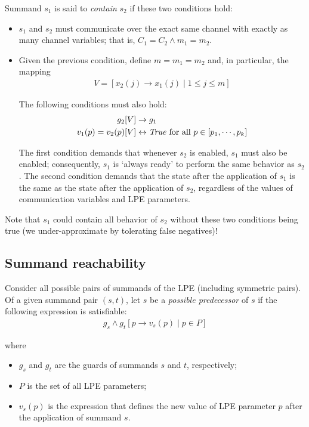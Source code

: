 Summand $s_1$ is said to \emph{contain} $s_2$ if these two conditions hold:

\begin{itemize}
\item $s_1$ and $s_2$ must communicate over the exact same channel with exactly as many channel variables; that is, $C_1 = C_2 \land m_1 = m_2$.

\item Given the previous condition, define $m = m_1 = m_2$ and, in particular, the mapping
\begin{align*}
V = [x_2(j) \rightarrow x_1(j) \;|\; 1 \leq j \leq m]
\end{align*}

The following conditions must also hold:
\begin{align*}
g_2[V] &\rightarrow g_1 \\
v_1(p) = v_2(p)[V] &\leftrightarrow \text{\textit{True}} \text{ for all } p \in [p_1, \cdots{}, p_k]
\end{align*}

The first condition demands that whenever $s_2$ is enabled, $s_1$ must also be enabled; consequently, $s_1$ is `always ready' to perform the same behavior as $s_2$.
The second condition demands that the state after the application of $s_1$ is the same as the state after the application of $s_2$, regardless of the values of communication variables and LPE parameters.
\end{itemize}

Note that $s_1$ could contain all behavior of $s_2$ without these two conditions being true (we under-approximate by tolerating false negatives)!

\subsection{Summand reachability}

Consider all possible pairs of summands of the LPE (including symmetric pairs).
Of a given summand pair $(s, t)$, let $s$ be a \emph{possible predecessor} of $s$ if the following expression is satisfiable:
\begin{align*}
g_s \land {g_t}[p \rightarrow v_s(p) \;|\; p \in P]
\end{align*}

where

\begin{itemize}
\item $g_s$ and $g_t$ are the guards of summands $s$ and $t$, respectively;
\item $P$ is the set of all LPE parameters;
\item $v_s(p)$ is the expression that defines the new value of LPE parameter $p$ after the application of summand $s$.
\end{itemize}

